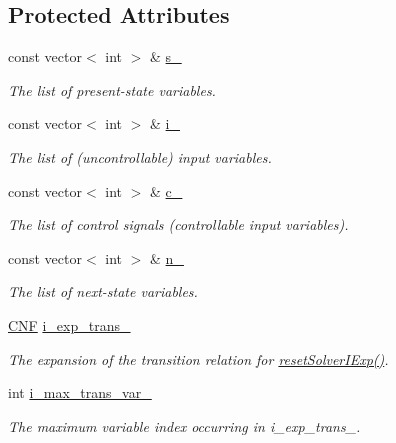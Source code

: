 \subsection*{Protected Attributes}
\begin{DoxyCompactItemize}
\item 
const vector$<$ int $>$ \& \hyperlink{classOrigUnivExpander_a3e52a15c675f3f9dfedfb0b083ed12c4}{s\-\_\-}
\begin{DoxyCompactList}\small\item\em The list of present-\/state variables. \end{DoxyCompactList}\item 
const vector$<$ int $>$ \& \hyperlink{classOrigUnivExpander_a1e2e61937364c1f6ae1113c3bee359ab}{i\-\_\-}
\begin{DoxyCompactList}\small\item\em The list of (uncontrollable) input variables. \end{DoxyCompactList}\item 
const vector$<$ int $>$ \& \hyperlink{classOrigUnivExpander_a55f9918f16eb03c75dc2a97182f75bdc}{c\-\_\-}
\begin{DoxyCompactList}\small\item\em The list of control signals (controllable input variables). \end{DoxyCompactList}\item 
const vector$<$ int $>$ \& \hyperlink{classOrigUnivExpander_aee21f9c6dab80e323bf9d17172fa9dc2}{n\-\_\-}
\begin{DoxyCompactList}\small\item\em The list of next-\/state variables. \end{DoxyCompactList}\item 
\hyperlink{classCNF}{C\-N\-F} \hyperlink{classOrigUnivExpander_a2b2a151446c62688478b7d548fca860c}{i\-\_\-exp\-\_\-trans\-\_\-}
\begin{DoxyCompactList}\small\item\em The expansion of the transition relation for \hyperlink{classOrigUnivExpander_abcd12e41626b01f53ac7b8c654fa9218}{reset\-Solver\-I\-Exp()}. \end{DoxyCompactList}\item 
int \hyperlink{classOrigUnivExpander_a150c22a734df707f76190a66b6eb2a44}{i\-\_\-max\-\_\-trans\-\_\-var\-\_\-}
\begin{DoxyCompactList}\small\item\em The maximum variable index occurring in i\-\_\-exp\-\_\-trans\-\_\-. \end{DoxyCompactList}\item 

\end{DoxyCompactItemize}
